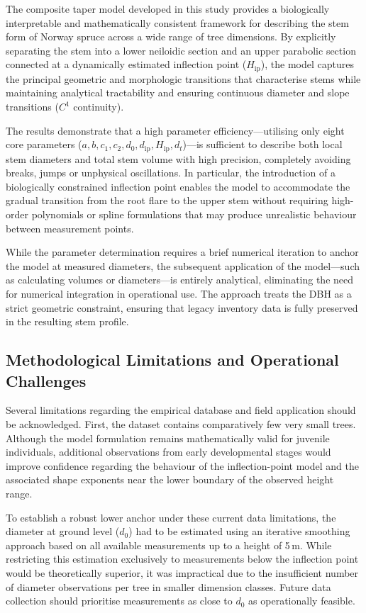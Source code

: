 \documentclass[twocolumn, bibliography=totoc]{scrartcl}
\begin{document}
The composite taper model developed in this study provides a biologically interpretable and mathematically consistent framework for describing the stem form of Norway spruce across a wide range of tree dimensions. By explicitly separating the stem into a lower neiloidic section and an upper parabolic section connected at a dynamically estimated inflection point ($H_{\text{ip}}$), the model captures the principal geometric and morphologic transitions that characterise stems while maintaining analytical tractability and ensuring continuous diameter and slope transitions ($C^1$ continuity).

The results demonstrate that a high parameter efficiency---utilising only eight core parameters ($a, b, c_1, c_2, d_0, d_{\text{ip}}, H_{\text{ip}}, d_t$)---is sufficient to describe both local stem diameters and total stem volume with high precision, completely avoiding breaks, jumps or unphysical oscillations. In particular, the introduction of a biologically constrained inflection point enables the model to accommodate the gradual transition from the root flare to the upper stem without requiring high-order polynomials or spline formulations that may produce unrealistic behaviour between measurement points.

While the parameter determination requires a brief numerical iteration to anchor the model at measured diameters, the subsequent application of the model---such as calculating volumes or diameters---is entirely analytical, eliminating the need for numerical integration in operational use. The approach treats the DBH as a strict geometric constraint, ensuring that legacy inventory data is fully preserved in the resulting stem profile.

\subsection{Methodological Limitations and Operational Challenges}

Several limitations regarding the empirical database and field application should be acknowledged. First, the dataset contains comparatively few very small trees. Although the model formulation remains mathematically valid for juvenile individuals, additional observations from early developmental stages would improve confidence regarding the behaviour of the inflection-point model and the associated shape exponents near the lower boundary of the observed height range. 

To establish a robust lower anchor under these current data limitations, the diameter at ground level ($d_0$) had to be estimated using an iterative smoothing approach based on all available measurements up to a height of 5\,m. While restricting this estimation exclusively to measurements below the inflection point would be theoretically superior, it was impractical due to the insufficient number of diameter observations per tree in smaller dimension classes. Future data collection should prioritise measurements as close to $d_0$ as operationally feasible.
\end{document}
